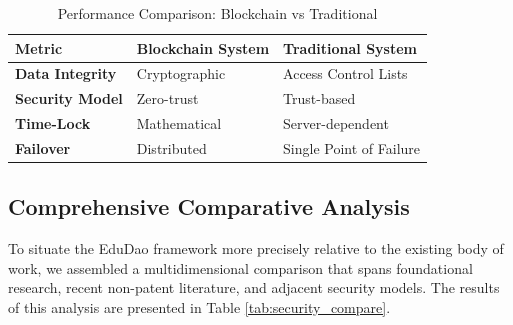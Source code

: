 \documentclass[final,5p,times]{elsarticle}
\begin{document}
\begin{table}[H]
\caption{Performance Comparison: Blockchain vs Traditional}
\label{tab:comparison}
\centering
\begin{tabularx}{\linewidth}{>{\raggedright\arraybackslash}X >{\raggedright\arraybackslash}X >{\raggedright\arraybackslash}X}
\toprule
\textbf{Metric} & \textbf{Blockchain System} & \textbf{Traditional System} \\ \midrule
\textbf{Data Integrity} & Cryptographic & Access Control Lists \\
\textbf{Security Model} & Zero-trust & Trust-based \\
\textbf{Time-Lock} & Mathematical & Server-dependent \\
\textbf{Failover} & Distributed & Single Point of Failure \\ \bottomrule
\end{tabularx}
\end{table}

\subsection{Comprehensive Comparative Analysis}

To situate the EduDao framework more precisely relative to the existing body of work, we assembled a multidimensional comparison that spans foundational research, recent non-patent literature, and adjacent security models. The results of this analysis are presented in Table \ref{tab:security_compare}.
\end{document}
